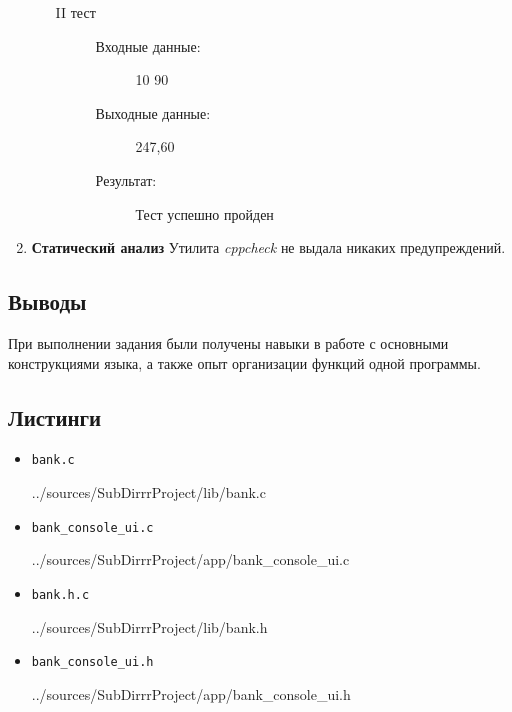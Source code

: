 \documentclass[12pt,a4paper]{report}
\begin{document}
\begin{enumerate}
\begin{enumerate}
\begin{description}
\item[II тест]
\hspace{\parindent}
\begin{flushleft}
\begin{description}
\item[Входные данные:] 10 90
\item[Выходные данные:] 247,60
\item[Результат:] Тест успешно пройден
\end{description}
\end{flushleft}
\end{description}
\end{enumerate}
\item \textbf{Статический анализ}
\hspace{\parindent}
Утилита \textit{cppcheck} не выдала никаких предупреждений.
\end{enumerate}

\subsection{Выводы}
\hspace{\parindent}
При выполнении задания были получены навыки в работе с основными конструкциями языка, а также опыт организации функций одной программы.
\subsection*{Листинги}
\begin{itemize}
\item[] \verb-bank.c-

{../sources/SubDirrrProject/lib/bank.c}
\item[] \verb-bank_console_ui.c-

{../sources/SubDirrrProject/app/bank_console_ui.c}
\item[] \verb-bank.h.c-

{../sources/SubDirrrProject/lib/bank.h}
\item[] \verb-bank_console_ui.h-

{../sources/SubDirrrProject/app/bank_console_ui.h}
\end{itemize}

%
\end{document}
